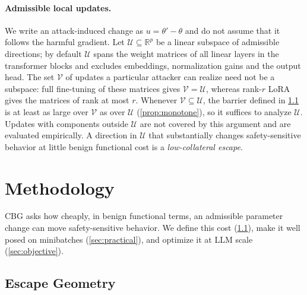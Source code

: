 \documentclass[11pt]{article}
\newcommand{\R}{\mathbb{R}}
\newcommand{\U}{\mathcal{U}}
\begin{document}
\paragraph{Admissible local updates.}
We write an attack-induced change as $u=\theta'-\theta$ and do not assume that it follows the harmful gradient. Let $\U\subseteq\R^p$ be a linear subspace of admissible directions; by default $\U$ spans the weight matrices of all linear layers in the transformer blocks and excludes embeddings, normalization gains and the output head. The set $\mathcal V$ of updates a particular attacker can realize need not be a subspace: full fine-tuning of these matrices gives $\mathcal V=\U$, whereas rank-$r$ LoRA gives the matrices of rank at most $r$. Whenever $\mathcal V\subseteq\U$, the barrier defined in \cref{sec:formulation} is at least as large over $\mathcal V$ as over $\U$ (\cref{prop:monotone}), so it suffices to analyze $\U$. Updates with components outside $\U$ are not covered by this argument and are evaluated empirically. A direction in $\U$ that substantially changes safety-sensitive behavior at little benign functional cost is a \emph{low-collateral escape}.



\section{Methodology}
\label{sec:method}

CBG asks how cheaply, in benign functional terms, an admissible parameter change can move safety-sensitive behavior. We define this cost (\cref{sec:formulation}), make it well posed on minibatches (\cref{sec:practical}), and optimize it at LLM scale (\cref{sec:objective}).

\subsection{Escape Geometry}
\label{sec:formulation}
\end{document}
